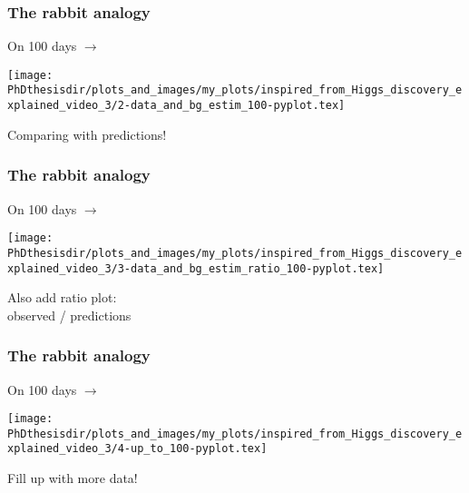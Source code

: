 \begin{frame}
\frametitle{The rabbit analogy}
\addtocounter{framenumber}{-1}
\begin{center}
\begin{minipage}[c]{.29\textwidth}
On \num{100} days $\rightarrow$
\end{minipage}
\begin{minipage}[c]{.4\textwidth}
\vspace{-\baselineskip}
\texttt{[image: \\PhDthesisdir/plots\_and\_images/my\_plots/inspired\_from\_Higgs\_discovery\_explained\_video\_3/2-data\_and\_bg\_estim\_100-pyplot.tex]}
\end{minipage}
\begin{minipage}[c]{.29\textwidth}
Comparing with predictions!
\end{minipage}
\end{center}
\end{frame}

\begin{frame}
\frametitle{The rabbit analogy}
\addtocounter{framenumber}{-1}
\begin{center}
\begin{minipage}[c]{.29\textwidth}
On \num{100} days $\rightarrow$
\end{minipage}
\begin{minipage}[c]{.4\textwidth}
\vspace{-\baselineskip}
\texttt{[image: \\PhDthesisdir/plots\_and\_images/my\_plots/inspired\_from\_Higgs\_discovery\_explained\_video\_3/3-data\_and\_bg\_estim\_ratio\_100-pyplot.tex]}
\end{minipage}
\begin{minipage}[c]{.29\textwidth}
Also add ratio plot:\\
observed / predictions
\end{minipage}
\end{center}
\end{frame}

\begin{frame}
\frametitle{The rabbit analogy}
\addtocounter{framenumber}{-1}
\begin{center}
\begin{minipage}[c]{.29\textwidth}
On \num{100} days $\rightarrow$
\end{minipage}
\begin{minipage}[c]{.4\textwidth}
\vspace{-\baselineskip}
\texttt{[image: \\PhDthesisdir/plots\_and\_images/my\_plots/inspired\_from\_Higgs\_discovery\_explained\_video\_3/4-up\_to\_100-pyplot.tex]}
\end{minipage}
\begin{minipage}[c]{.29\textwidth}
Fill up with more data!
\end{minipage}
\end{center}
\end{frame}

